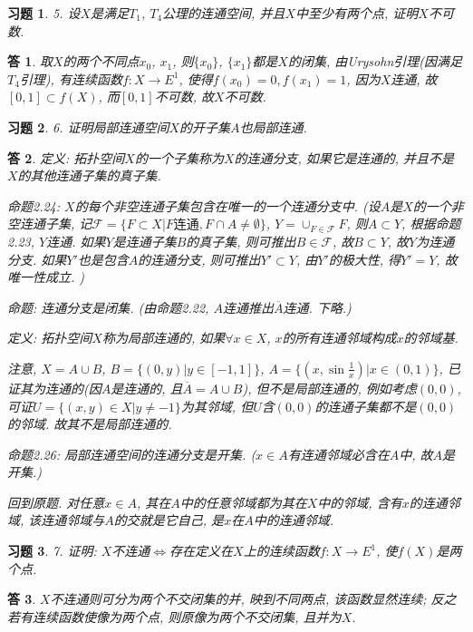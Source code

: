 \documentclass{ctexart}%
\newtheorem*{exercise}{习题}
\newtheorem*{solution}{答}
\theoremstyle{definition}
\theoremstyle{remark}
\begin{document}
\begin{exercise}5. 设$X$是满足$T_1$, $T_4$公理的连通空间, 并且$X$中至少有两个点, 证明$X$不可数.
\end{exercise}
\begin{solution}
取$X$的两个不同点$x_0$, $x_1$, 则$\{x_0\}$, $\{x_1\}$都是$X$的闭集, 由Urysohn引理(因满足$T_4$引理), 有连续函数$f:X\rightarrow E^1$, 使得$f(x_0)=0, f(x_1)=1$, 因为$X$连通, 故$[0,1]\subset f(X)$, 而$[0,1]$不可数, 故$X$不可数. 
\end{solution}

\begin{exercise}6. 证明局部连通空间$X$的开子集$A$也局部连通.
\end{exercise}
\begin{solution}
定义: 拓扑空间$X$的一个子集称为$X$的连通分支, 如果它是连通的, 并且不是$X$的其他连通子集的真子集. 

命题2.24: $X$的每个非空连通子集包含在唯一的一个连通分支中. (设$A$是$X$的一个非空连通子集, 记$\mathscr{F}=\{F\subset X|F\text{连通},F\cap A\neq \emptyset\}$, $Y=\cup_{F\in \mathscr{F}} F$, 则$A\subset Y$, 根据命题2.23, $Y$连通. 如果$Y$是连通子集$B$的真子集, 则可推出$B\in \mathscr{F}$, 故$B\subset Y$, 故$Y$为连通分支. 如果$Y'$也是包含$A$的连通分支, 则可推出$Y'\subset Y$, 由$Y'$的极大性, 得$Y'=Y$, 故唯一性成立. )

命题: 连通分支是闭集. (由命题2.22, $A$连通推出$\overline{A}$连通. 下略.)

定义: 拓扑空间$X$称为局部连通的, 如果$\forall x\in X$, $x$的所有连通邻域构成$x$的邻域基.

注意, $X=A\cup B$, $B=\{(0,y)|y\in [-1,1]\}$, $A=\{(x,\sin\frac{1}{x})|x\in (0,1)\}$, 已证其为连通的(因$A$是连通的, 且$\overline{A}=A\cup B$), 但不是局部连通的, 例如考虑$(0,0)$, 可证$U=\{(x,y)\in X|y\neq -1\}$为其邻域, 但$U$含$(0,0)$的连通子集都不是$(0,0)$的邻域. 故其不是局部连通的. 

命题2.26: 局部连通空间的连通分支是开集. ($x\in A$有连通邻域必含在$A$中, 故$A$是开集.)

回到原题. 对任意$x\in A$, 其在$A$中的任意邻域都为其在$X$中的邻域, 含有$x$的连通邻域, 该连通邻域与$A$的交就是它自己, 是$x$在$A$中的连通邻域.
\end{solution}

\begin{exercise}7. 证明: $X$不连通$\Longleftrightarrow$存在定义在$X$上的连续函数$f:X\rightarrow E^1$, 使$f(X)$是两个点. 
\end{exercise}
\begin{solution}$X$不连通则可分为两个不交闭集的并, 映到不同两点, 该函数显然连续; 反之若有连续函数使像为两个点, 则原像为两个不交闭集, 且并为$X$. 
\end{solution}
\end{document}
